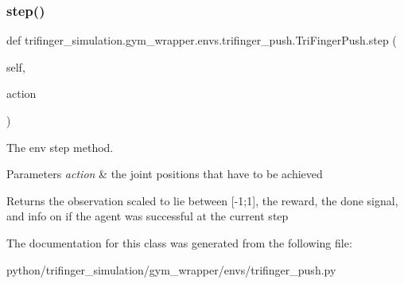 \subsubsection{\texorpdfstring{step()}{step()}}
{\footnotesize\ttfamily def trifinger\+\_\+simulation.\+gym\+\_\+wrapper.\+envs.\+trifinger\+\_\+push.\+Tri\+Finger\+Push.\+step (\begin{DoxyParamCaption}\item[{}]{self,  }\item[{}]{action }\end{DoxyParamCaption})}



The env step method. 


\begin{DoxyParams}{Parameters}
{\em action} & the joint positions that have to be achieved\\
\hline
\end{DoxyParams}
\begin{DoxyReturn}{Returns}
the observation scaled to lie between \mbox{[}-\/1;1\mbox{]}, the reward, the done signal, and info on if the agent was successful at the current step 
\end{DoxyReturn}


The documentation for this class was generated from the following file\+:\begin{DoxyCompactItemize}
\item 
python/trifinger\+\_\+simulation/gym\+\_\+wrapper/envs/trifinger\+\_\+push.\+py\end{DoxyCompactItemize}
